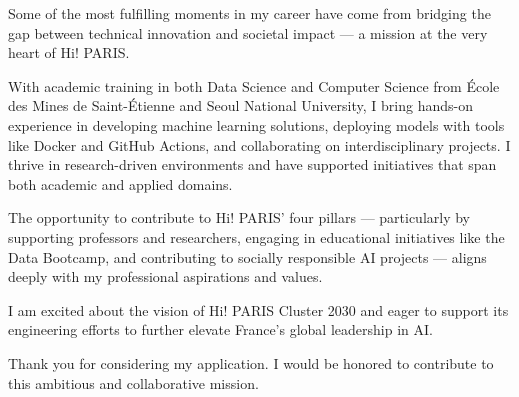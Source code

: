 
\newcommand{\Company}{Hi!Paris}
\recipient{\RecruitmentTeam{\Company}}{\Company\\Palaiseau\\ France}
\date{April 22 2025}
\makelettertitle

Some of the most fulfilling moments in my career have come from bridging the gap between technical innovation and societal impact — a mission at the very heart of Hi! PARIS.

With academic training in both Data Science and Computer Science from École des Mines de Saint-Étienne and Seoul National University, I bring hands-on experience in developing machine learning solutions, deploying models with tools like Docker and GitHub Actions, and collaborating on interdisciplinary projects. I thrive in research-driven environments and have supported initiatives that span both academic and applied domains.

The opportunity to contribute to Hi! PARIS’ four pillars — particularly by supporting professors and researchers, engaging in educational initiatives like the Data Bootcamp, and contributing to socially responsible AI projects — aligns deeply with my professional aspirations and values.

I am excited about the vision of Hi! PARIS Cluster 2030 and eager to support its engineering efforts to further elevate France’s global leadership in AI.

Thank you for considering my application. I would be honored to contribute to this ambitious and collaborative mission.

\makeletterclosing
